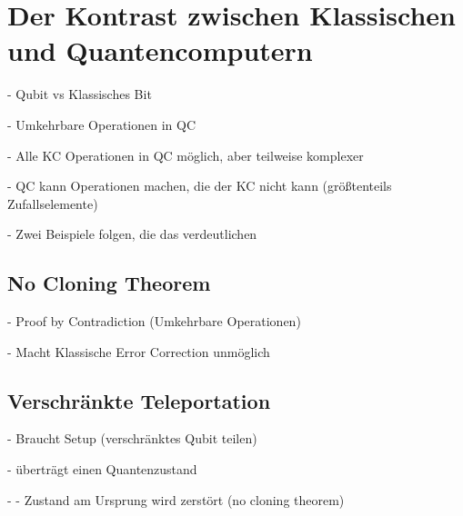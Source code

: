 \section{Der Kontrast zwischen Klassischen und Quantencomputern}

- Qubit vs Klassisches Bit

- Umkehrbare Operationen in QC

- Alle KC Operationen in QC möglich, aber teilweise komplexer

- QC kann Operationen machen, die der KC nicht kann (größtenteils Zufallselemente)

- Zwei Beispiele folgen, die das verdeutlichen

\subsection{No Cloning Theorem}

- Proof by Contradiction (Umkehrbare Operationen)

- Macht Klassische Error Correction unmöglich

\subsection{Verschränkte Teleportation}

- Braucht Setup (verschränktes Qubit teilen)

- überträgt einen Quantenzustand

- - Zustand am Ursprung wird zerstört (no cloning theorem)
